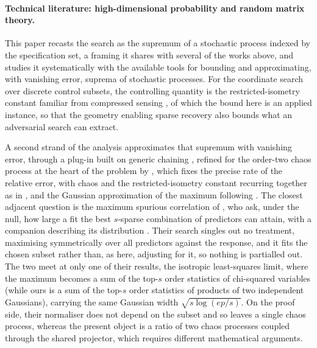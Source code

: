 \paragraph{Technical literature: high-dimensional probability and random matrix theory.} This paper recasts the search as the supremum
of a stochastic process indexed by the specification set, a framing it shares
with several of the works above, and studies it systematically with the available
tools for bounding and approximating, with vanishing error, suprema of stochastic
processes. For the coordinate search over discrete control subsets, the
controlling quantity is the restricted-isometry constant familiar from compressed
sensing
\citep{candesTao2005decoding,bickelRitovTsybakov2009,raskuttiWainwrightYu2010restricted},
of which the bound here is an applied instance,  so that the geometry enabling
sparse recovery also bounds what an adversarial search can extract.

A second strand of the analysis approximates that supremum with vanishing error,
through a plug-in built on generic chaining \citep{talagrand2014upper}, refined
for the order-two chaos process at the heart of the problem by
\citet{dirksen2015tail}, which fixes the precise rate of the relative error, with
chaos and the restricted-isometry constant recurring together as in
\citet{krahmerMendelsonRauhut2014chaos}, and the Gaussian approximation of the
maximum following \citet{cck2014gaussianapprox}.  The closest adjacent question is
the maximum spurious correlation of \citet{fanZhou2016guarding}, who ask, under
the null, how large a fit the best $s$-sparse combination of predictors can
attain, with a companion describing its distribution
\citep{fanShaoZhou2018spurious}. Their search singles out no treatment, maximising
symmetrically over all predictors against the response, and it fits the chosen
subset rather than, as here, adjusting for it, so nothing is partialled out.  The
two meet at only one of their results, the isotropic least-squares limit, where
the maximum becomes a sum of the top-$s$ order statistics of chi-squared variables
(while ours is a sum of the top-$s$ order statistics of products of two
independent Gaussians), carrying the same Gaussian width $\sqrt{s\log(ep/s)}$.  On
the proof side, their normaliser does not depend on the subset and so leaves a
single chaos process, whereas the present object is a ratio of two chaos processes
coupled through the shared projector, which requires different mathematical
arguments.

